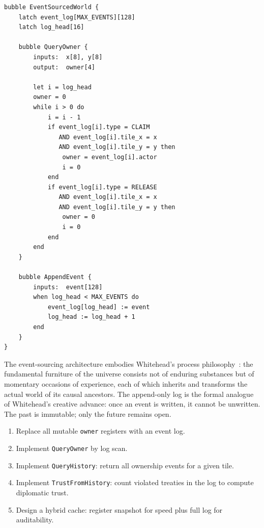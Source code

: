 \documentclass[11pt,a4paper,openany]{book}
\theoremstyle{plain}
\theoremstyle{definition}
\theoremstyle{remark}
\newenvironment{implementation}{%
  \begin{mdframed}[
    linecolor=sphereamber!80, backgroundcolor=sphereamber!5,
    linewidth=1pt, innertopmargin=8pt, innerbottommargin=8pt,
    innerleftmargin=10pt, innerrightmargin=10pt,
    skipabove=10pt, skipbelow=6pt
  ]%
  \setlength{\parindent}{0pt}%
  \noindent{\textcolor{sphereamber!80!black}{\textbf{Implementation}}}\par\smallskip\ignorespaces
}{\end{mdframed}}
\newenvironment{perspective}{%
  \begin{mdframed}[
    linecolor=spherered!40, backgroundcolor=spherered!4,
    linewidth=1pt, innertopmargin=8pt, innerbottommargin=8pt,
    innerleftmargin=10pt, innerrightmargin=10pt,
    skipabove=10pt, skipbelow=6pt
  ]%
  \setlength{\parindent}{0pt}%
  \noindent{\textcolor{spherered}{\textbf{Perspective}}}\par\smallskip\ignorespaces
}{\end{mdframed}}
\newenvironment{project}[1]{%
  \begin{tcolorbox}[
    title={\textbf{Project: #1}},
    colback=projectbg,
    colframe=sphereblue,
    fonttitle=\bfseries\color{white},
    coltitle=white,
    attach boxed title to top left={yshift=-2mm, xshift=4mm},
    boxed title style={colback=sphereblue, sharp corners},
    sharp corners,
    breakable,
    before upper={\normalfont\setlength{\parindent}{0pt}\tolerance=9999\hbadness=9999}
  ]
}{\end{tcolorbox}}
\newcommand{\Spbox}{\textsc{Spherepop}\xspace}
\newcommand{\Spbox}{\textbf{Spherepop}\xspace}
\begin{document}
\begin{implementation}
\begin{lstlisting}[caption={Append-only event sourcing in \Spbox }]
bubble EventSourcedWorld {
    latch event_log[MAX_EVENTS][128]
    latch log_head[16]

    bubble QueryOwner {
        inputs:  x[8], y[8]
        output:  owner[4]

        let i = log_head
        owner = 0
        while i > 0 do
            i = i - 1
            if event_log[i].type = CLAIM
               AND event_log[i].tile_x = x
               AND event_log[i].tile_y = y then
                owner = event_log[i].actor
                i = 0
            end
            if event_log[i].type = RELEASE
               AND event_log[i].tile_x = x
               AND event_log[i].tile_y = y then
                owner = 0
                i = 0
            end
        end
    }

    bubble AppendEvent {
        inputs:  event[128]
        when log_head < MAX_EVENTS do
            event_log[log_head] := event
            log_head := log_head + 1
        end
    }
}
\end{lstlisting}
\end{implementation}

\begin{perspective}
  The event-sourcing architecture embodies Whitehead's process
  philosophy~\cite{Whitehead}: the fundamental furniture of the universe
  consists not of enduring substances but of momentary occasions of
  experience, each of which inherits and transforms the actual world of
  its causal ancestors. The append-only log is the formal analogue of
  Whitehead's creative advance: once an event is written, it cannot be
  unwritten. The past is immutable; only the future remains open.
\end{perspective}

\begin{project}{Event-Sourced Tile Ownership}
  \begin{enumerate}
    \item Replace all mutable \texttt{owner} registers with an event log.
    \item Implement \texttt{QueryOwner} by log scan.
    \item Implement \texttt{QueryHistory}: return all ownership events
          for a given tile.
    \item Implement \texttt{TrustFromHistory}: count violated treaties
          in the log to compute diplomatic trust.
    \item Design a hybrid cache: register snapshot for speed plus full
          log for auditability.
  \end{enumerate}
\end{project}
\end{document}
